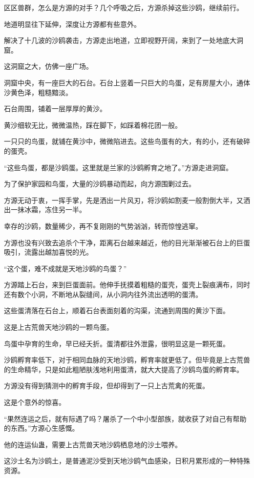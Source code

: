 \begin{this_body}
区区兽群，怎么是方源的对手？几个呼吸之后，方源杀掉这些沙鸥，继续前行。

地道明显往下延伸，深度让方源都有些意外。

解决了十几波的沙鸥袭击，方源走出地道，立即视野开阔，来到了一处地底大洞窟。

这洞窟之大，仿佛一座广场。

洞窟中央，有一座巨大的石台。石台上竖着一只巨大的鸟蛋，足有房屋大小，通体沙黄色泽，粗糙黯淡。

石台周围，铺着一层厚厚的黄沙。

黄沙细软无比，微微温热，踩在脚下，如踩着棉花团一般。

一只只的鸟蛋，就铺在黄沙中，微微陷进去。这些鸟蛋有的大，有的小，还有破碎的蛋壳。

“这些鸟蛋，都是沙鸥蛋。这里就是兰家的沙鸥孵育之地了。”方源走进洞窟。

为了保护家园和鸟蛋，大量的沙鸥暴动而起，向方源围剿过去。

方源无动于衷，一挥手掌，先是洒出一片风刃，将沙鸥如割麦一般割倒大半，又洒出一抹冰霜，冻住另一半。

幸存的沙鸥，数量稀少，再不复刚刚的气势汹汹，转而惊惶逃窜。

方源也没有兴致去追杀个干净，距离石台越来越近，他的目光渐渐被石台上的巨蛋吸引，流露出越加喜悦的光。

“这个蛋，难不成就是天地沙鸥的鸟蛋？”

方源踏上石台，来到巨蛋面前。他伸手抚摸着粗糙的蛋壳，蛋壳上裂痕满布，同时还有数个小洞，不断地从裂缝间，从小洞内往外流出透明的蛋清。

这些蛋清落在石台上，顺着石台表面刻着的沟渠，流通到周围的黄沙下面。

这是上古荒兽天地沙鸥的一颗鸟蛋。

鸟蛋中孕育的生命，早已经夭折。蛋清都往外泄露，很明显这是一颗死蛋。

沙鸥孵育率低下，对于相同血脉的天地沙鸥，孵育率就更低了。但毕竟是上古荒兽的生命精华，只是如此粗陋肤浅地利用蛋清，就大大提高了沙鸥鸟蛋的孵育率。

方源没有得到猜测中的孵育手段，但却得到了一只上古荒禽的死蛋。

这是个意外的惊喜。

“果然连运之后，就有际遇了吗？屠杀了一个中小型部族，就收获了对自己有帮助的东西。”方源心生感慨。

他的连运仙蛊，需要上古荒兽天地沙鸥栖息地的沙土喂养。

这沙土名为沙鸥土，是普通泥沙受到天地沙鸥气血感染，日积月累形成的一种特殊资源。


\end{this_body}
